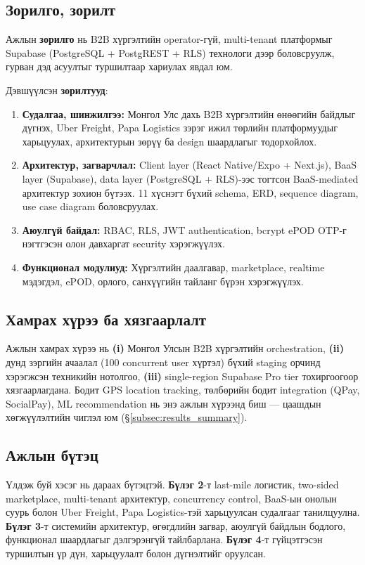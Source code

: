 \subsection{Зорилго, зорилт}

Ажлын \textbf{зорилго} нь B2B хүргэлтийн operator-гүй, multi-tenant платформыг Supabase (PostgreSQL + PostgREST + RLS) технологи дээр боловсруулж, гурван дэд асуултыг туршилтаар хариулах явдал юм.

Дэвшүүлсэн \textbf{зорилтууд}:

\begin{enumerate}
    \item \textbf{Судалгаа, шинжилгээ:} Монгол Улс дахь B2B хүргэлтийн өнөөгийн байдлыг дүгнэх, Uber Freight, Papa Logistics зэрэг ижил төрлийн платформуудыг харьцуулах, архитектурын зөрүү ба design шаардлагыг тодорхойлох.
    \item \textbf{Архитектур, загварчлал:} Client layer (React Native/Expo + Next.js), BaaS layer (Supabase), data layer (PostgreSQL + RLS)-ээс тогтсон BaaS-mediated архитектур зохион бүтээх. 11 хүснэгт бүхий schema, ERD, sequence diagram, use case diagram боловсруулах.
    \item \textbf{Аюулгүй байдал:} RBAC, RLS, JWT authentication, bcrypt ePOD OTP-г нэгтгэсэн олон давхаргат security хэрэгжүүлэх.
    \item \textbf{Функционал модулиуд:} Хүргэлтийн даалгавар, marketplace, realtime мэдэгдэл, ePOD, орлого, санхүүгийн тайланг бүрэн хэрэгжүүлэх.
\end{enumerate}

\subsection{Хамрах хүрээ ба хязгаарлалт}

Ажлын хамрах хүрээ нь \textbf{(i)} Монгол Улсын B2B хүргэлтийн orchestration, \textbf{(ii)} дунд зэргийн ачаалал (100 concurrent user хүртэл) бүхий staging орчинд хэрэгжсэн техникийн нотолгоо, \textbf{(iii)} single-region Supabase Pro tier тохиргоогоор хязгаарлагдана. Бодит GPS location tracking, төлбөрийн бодит integration (QPay, SocialPay), ML recommendation нь энэ ажлын хүрээнд биш — цаашдын хөгжүүлэлтийн чиглэл юм (§\ref{subsec:results_summary}).

\subsection{Ажлын бүтэц}

Үлдэж буй хэсэг нь дараах бүтэцтэй. \textbf{Бүлэг 2}-т last-mile логистик, two-sided marketplace, multi-tenant архитектур, concurrency control, BaaS-ын онолын суурь болон Uber Freight, Papa Logistics-тэй харьцуулсан судалгааг танилцуулна. \textbf{Бүлэг 3}-т системийн архитектур, өгөгдлийн загвар, аюулгүй байдлын бодлого, функционал шаардлагыг дэлгэрэнгүй тайлбарлана. \textbf{Бүлэг 4}-т гүйцэтгэсэн туршилтын үр дүн, харьцуулалт болон дүгнэлтийг оруулсан.
